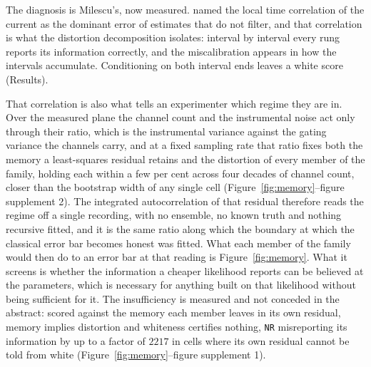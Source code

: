 The diagnosis is Milescu's, now measured. \citet{milescu2005maximum} named the local time correlation of the current as the dominant error of estimates that do not filter, and that correlation is what the distortion decomposition isolates: interval by interval every rung reports its information correctly, and the miscalibration appears in how the intervals accumulate. Conditioning on both interval ends leaves a white score (Results).

That correlation is also what tells an experimenter which regime they are in. Over the measured plane the channel count and the instrumental noise act only through their ratio, which is the instrumental variance against the gating variance the channels carry, and at a fixed sampling rate that ratio fixes both the memory a least-squares residual retains and the distortion of every member of the family, holding each within a few per cent across four decades of channel count, closer than the bootstrap width of any single cell (Figure~\ref{fig:memory}--figure supplement 2). The integrated autocorrelation of that residual therefore reads the regime off a single recording, with no ensemble, no known truth and nothing recursive fitted, and it is the same ratio along which the boundary at which the classical error bar becomes honest was fitted. What each member of the family would then do to an error bar at that reading is Figure~\ref{fig:memory}. What it screens is whether the information a cheaper likelihood reports can be believed at the parameters, which is necessary for anything built on that likelihood without being sufficient for it. The insufficiency is measured and not conceded in the abstract: scored against the memory each member leaves in its own residual, memory implies distortion and whiteness certifies nothing, \texttt{NR} misreporting its information by up to a factor of $2217$ in cells where its own residual cannot be told from white (Figure~\ref{fig:memory}--figure supplement 1).

